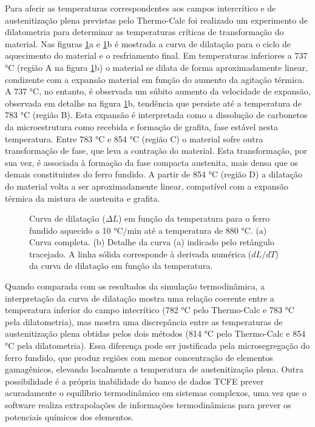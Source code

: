 Para aferir as temperaturas correspondentes aos campos intercrítico e de austenitização plena previstas pelo Thermo-Calc\textregistered{} foi realizado um experimento de dilatometria para determinar as temperaturas críticas de transformação do material. Nas figuras \ref{fig:dilTempera}a e \ref{fig:dilTempera}b é mostrada a curva de dilatação para o ciclo de aquecimento do material e o resfriamento final. Em temperaturas inferiores a 737 °C (região A na figura \ref{fig:dilTempera}b) o material se dilata de forma aproximadamente linear, condizente com a expansão material em função do aumento da agitação térmica. A 737 °C, no entanto, é observada um súbito aumento da velocidade de expansão, observada em detalhe na figura \ref{fig:dilTempera}b, tendência que persiste até a temperatura de 783 °C (região B). Esta expansão é interpretada como a dissolução de carbonetos da microestrutura como recebida e formação de grafita, fase estável nesta temperatura. Entre 783 °C e 854 °C (região C) o material sofre outra transformação de fase, que leva a contração do material. Esta transformação, por sua vez, é associada à formação da fase compacta austenita, mais densa que os demais constituintes do ferro fundido. A partir de 854 °C (região D) a dilatação do material volta a ser aproximadamente linear, compatível com a expansão térmica da mistura de austenita e grafita.

\begin{figure}
	\quad
	\caption{Curva de dilatação ($\Delta L$) em função da temperatura para o ferro fundido aquecido a 10 °C/min até a temperatura de 880 °C. (a) Curva completa. (b) Detalhe da curva (a) indicado pelo retângulo tracejado. A linha sólida corresponde à derivada numérica ($dL/dT$) da curva de dilatação em função da temperatura.}
	\label{fig:dilTempera}
\end{figure}

Quando comparada com os resultados da simulação termodinâmica, a interpretação da curva de dilatação mostra uma relação coerente entre a temperatura inferior do campo intecrítico (782 °C pelo Thermo-Calc\textregistered{} e 783 °C pela dilatometria), mas mostra uma discrepância entre as temperaturas de austenitização plena obtidas pelos dois métodos (814 °C pelo Thermo-Calc\textregistered{} e 854 °C pela dilatometria). Essa diferença pode ser justificada pela microsegregação do ferro fundido, que produz regiões com menor concentração de elementos gamagênicos, elevando localmente a temperatura de austenitização plena. Outra possibilidade é a própria inabilidade do banco de dados TCFE prever acuradamente o equilíbrio termodinâmico em sistemas complexos, uma vez que o software realiza extrapolações de informações termodinâmicas para prever os potenciais químicos dos elementos.

